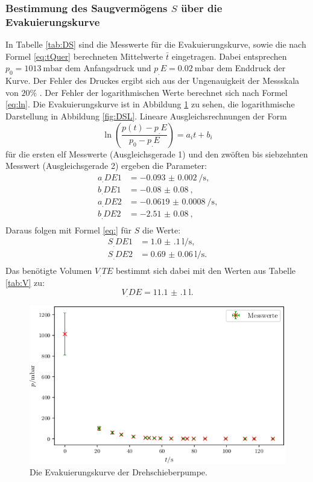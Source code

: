 \subsubsection{Bestimmung des Saugvermögens $S$ über die Evakuierungskurve}

In Tabelle \ref{tab:DS} sind die Messwerte für die Evakuierungskurve, sowie die nach Formel \eqref{eq:tQuer} berechneten Mittelwerte $\bar{t}$ eingetragen.
Dabei entsprechen $p_0=\SI{1013}{\milli\bar}$ dem Anfangsdruck und $p_.E=\SI{0.02}{\milli\bar}$ dem Enddruck der Kurve. Der Fehler des Druckes ergibt sich aus der Ungenauigkeit der Messskala von $20\%$ \cite{V70}. 
Der Fehler der logarithmischen Werte berechnet sich nach Formel \eqref{eq:ln}.
Die Evakuierungskurve ist in Abbildung \ref{fig:DSE} zu sehen, die logarithmische Darstellung in Abbildung \ref{fig:DSL}.
Lineare Ausgleichsrechnungen der Form
\[
\ln\left(\frac{p(t)-p_.E}{p_0-p_.E}\right) = a_it+b_i
\]
für die ersten elf Messwerte (Ausgleichsgerade 1) und den zwöften bis siebzehnten Messwert (Ausgleichsgerade 2) ergeben die Parameter:
\begin{align*}
a_.{DE1} &= \SI{-0.093(2)}{\per\second} \text{,}\\
b_.{DE1} &= \SI{-0.08(8)}{} \text{,}\\
a_.{DE2} &= \SI{-0.0619(8)}{\per\second} \text{,}\\
b_.{DE2} &= \SI{-2.51(8)}{} \text{,}\\
\end{align*} 
Daraus folgen mit Formel \eqref{eq:} für $S$ die Werte:
\begin{align*}
S_.{DE1} &= \SI{1.0(1)}{\litre\per\second} \text{,}\\
S_.{DE2} &= \SI{0.69(6)}{\litre\per\second} \text{.}\\
\end{align*} 
Das benötigte Volumen $V_.{TE}$ bestimmt sich dabei mit den Werten aus Tabelle \ref{tab:V} zu:
\[
V_.{DE} = \SI{11.1(1)}{\litre}\text{.}
\]

\begin{figure}
\centering
\includegraphics[width=\linewidth-70pt,height=\textheight-70pt,keepaspectratio]{content/images/DSE.png}
\caption{Die Evakuierungskurve der Drehschieberpumpe.}
\label{fig:DSE}
\end{figure}

